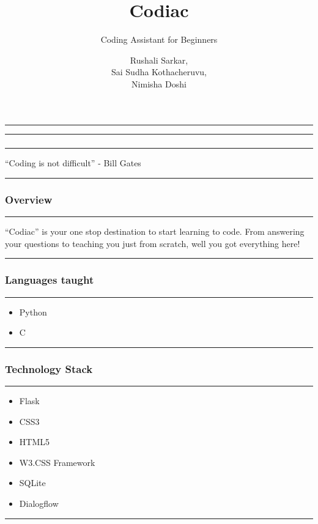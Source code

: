 \documentclass[14pt]{beamer}
\title[Codiac]{Codiac}
\subtitle[Coding Assitant]{Coding Assistant for Beginners}
\author[Team 2]{Rushali Sarkar, \\ Sai Sudha Kothacheruvu, \\ Nimisha Doshi}
\begin{document}
\begin{frame}
    \noindent
    {\color{pink} \rule{\linewidth}{0.7mm} }
    \titlepage
    \noindent
    {\color{pink} \rule{\linewidth}{0.7mm} }
\end{frame}


\begin{frame}
	\frametitle{}
   \noindent
   {\color{pink} \rule{\linewidth}{0.7mm}}
   ``Coding is not difficult'' \linebreak - Bill Gates
   \noindent
   {\color{pink} \rule{\linewidth}{0.7mm}}
\end{frame}	



\begin{frame}
    \frametitle{Overview}
    \noindent
    {\color{pink} \rule{\linewidth}{0.7mm} }
    ``Codiac'' is your one stop destination to start learning to code. From answering your questions to teaching you just from scratch, well you got everything here!
    \noindent
    {\color{pink} \rule{\linewidth}{0.7mm} }
\end{frame}

\begin{frame}
    \frametitle{Languages taught}
    \noindent
    {\color{pink} \rule{\linewidth}{0.7mm} }
    \begin{itemize}
    \item Python 
    \item C
\end{itemize}   
\noindent
    {\color{pink} \rule{\linewidth}{0.7mm} }
\end{frame}


\begin{frame}
    \frametitle{Technology Stack}
    \noindent
    {\color{pink} \rule{\linewidth}{0.7mm} }
    \begin{itemize}
        \pause
    \item Flask \\
        \pause
    \item CSS3 \\
        \pause
    \item HTML5 \\
        \pause
    \item W3.CSS Framework \\
        \pause
    \item SQLite \\
	\pause    
    \item Dialogflow \\
\end{itemize}
\noindent
    {\color{pink} \rule{\linewidth}{0.7mm} }
\end{frame}
\end{document}

